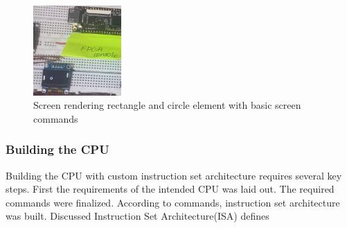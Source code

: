 \documentclass[a4paper,12pt]{article}
\begin{document}
    \newpage

    \begin{figure}
        \centering
        \includegraphics[width=0.3\textwidth ]{./images/uart_image.jpg}
        \caption{Screen rendering rectangle and circle element with basic screen commands }
    \end{figure}

    \subsubsection{Building the CPU}
    Building the CPU with custom instruction set architecture requires several key steps. First the requirements of the intended CPU was laid out. The required commands were finalized. According to commands, instruction set architecture was built. Discussed Instruction Set Architecture(ISA) defines 
\end{document}
